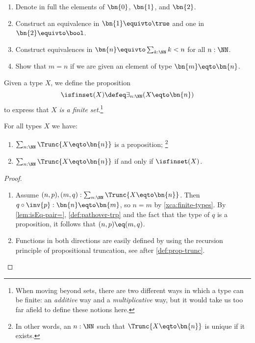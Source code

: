 \begin{xca}\label{xca:finite-types}
\leavevmode
  \begin{enumerate}
  \item Denote in full the elements of $\bn{0}$, $\bn{1} $, and $\bn{2}$.
  \item Construct an equivalence in $\bn{1} \equivto \true$
                         and one in $\bn{2} \equivto \bool$.
  \item Construct equivalences in  $\bn{n} \equivto \sum_{k:\NN} k<n$
        for all $n:\NN$.
  \item Show that $m=n$ if we are given an element of type
        $\bn{m} \eqto \bn{n}$.\qedhere
  \end{enumerate}
\end{xca}
\begin{definition}\label{def:is-finite}
  Given a type $X$, we define the proposition
  \[
    \textstyle
    \isfinset(X) \defeq \exists_{n:\NN}(X \eqto \bn{n})
  \]
  to express that $X$ \emph{is a finite set}.\footnote{%
    When moving beyond sets, there are two different ways
    in which a type can be finite: an \emph{additive}
    way and a \emph{multiplicative} way, but
    it would take us too far afield to define these notions
    here.} %
\end{definition}
\begin{lemma}\label{lem:maxonefinitetype}
For all types $X$ we have:
  \begin{enumerate}
  \item $\sum_{n:\NN} \Trunc{X\eqto\bn{n}}$ is a proposition;%
  \footnote{In other words, an $n:\NN$ such that $\Trunc{X\eqto\bn{n}}$
  is unique if it exists.}
  \item $\sum_{n:\NN} \Trunc{X\eqto\bn{n}}$ if and only if $\isfinset(X)$.
  \end{enumerate}
\end{lemma}
\begin{proof}
\leavevmode
\begin{enumerate}
\item Assume $(n,p),(m,q): \sum_{n:\NN}\Trunc{X\eqto\bn{n}}$.
Then $q\circ\inv{p}: {\bn{n}\eqto\bn{m}}$, so ${n=m}$
by \cref{xca:finite-types}. By \cref{lem:isEq-pair=},
\cref{def:pathover-trp} and the fact that the type of $q$
is a proposition, it follows that $(n,p) \eq (m,q)$.
\item Functions in both directions are easily defined by
using the recursion principle of propositional truncation,
see after \cref{def:prop-trunc}.\qedhere
\end{enumerate}
\end{proof}

